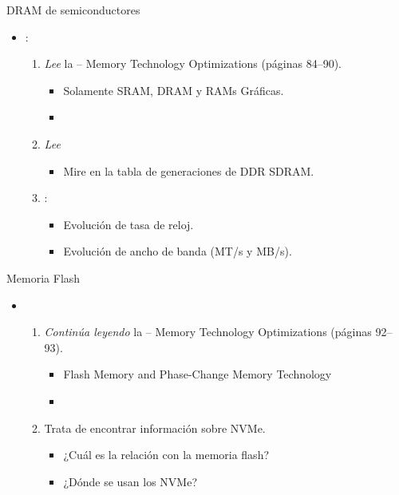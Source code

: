 \begin{frame}[t]{DRAM de semiconductores}
  \begin{itemize}
    \item {}:
      \begin{enumerate}
        \item \emph{Lee} la  -- 
              Memory Technology Optimizations (páginas 84--90).
          \begin{itemize}
            \item Solamente SRAM, DRAM y RAMs Gráficas.
            \item \bibhennessy
          \end{itemize}

        \item \emph{Lee} 
          \begin{itemize}
            \item Mire en la tabla de generaciones de DDR SDRAM.
          \end{itemize}

        \item {}:
          \begin{itemize}
            \item Evolución de tasa de reloj.
            \item Evolución de ancho de banda (MT/s y MB/s).
          \end{itemize}
      \end{enumerate}
  \end{itemize}
\end{frame}

\begin{frame}[t]{Memoria Flash}
  \begin{itemize}
    \item {}
      \begin{enumerate}
        \item \emph{Continúa leyendo} la  -- 
              Memory Technology Optimizations (páginas 92--93).
          \begin{itemize}
            \item Flash Memory and Phase-Change Memory Technology
            \item \bibhennessy
          \end{itemize}

        \item Trata de encontrar información sobre NVMe.
          \begin{itemize}
            \item ¿Cuál es la relación con la memoria flash?
            \item ¿Dónde se usan los NVMe?
          \end{itemize}
      \end{enumerate}
  \end{itemize}
\end{frame}

